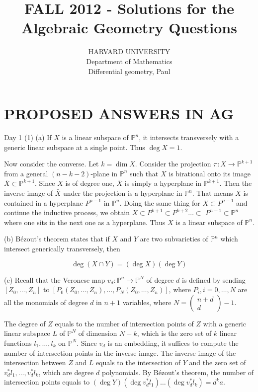 \documentclass[10pt]{article}
\title{FALL 2012 - Solutions for the Algebraic Geometry Questions }
\author{HARVARD UNIVERSITY\\
Department of Mathematics\\
Differential geometry, Paul}
\date{}
\begin{document}
\maketitle
\section{PROPOSED ANSWERS IN AG}
Day 1 (1) (a) If $X$ is a linear subspace of $\mathbb{P}^{n}$, it intersects transversely with a generic linear subspace at a single point. Thus $\operatorname{deg} X=1$.

Now consider the converse. Let $k=\operatorname{dim} X$. Consider the projection $\pi: X \rightarrow \mathbb{P}^{k+1}$ from a general $(n-k-2)$-plane in $\mathbb{P}^{n}$ such that $X$ is birational onto its image $\bar{X} \subset \mathbb{P}^{k+1}$. Since $X$ is of degree one, $\bar{X}$ is simply a hyperplane in $\mathbb{P}^{k+1}$. Then the inverse image of $\bar{X}$ under the projection is a hyperplane in $\mathbb{P}^{n}$. That means $X$ is contained in a hyperplane $P^{n-1}$ in $\mathbb{P}^{n}$. Doing the same thing for $X \subset P^{n-1}$ and continue the inductive process, we obtain $X \subset P^{k+1} \subset P^{k+2} \ldots \subset$ $P^{n-1} \subset \mathbb{P}^{n}$ where one sits in the next one as a hyperplane. Thus $X$ is a linear subspace of $\mathbb{P}^{n}$.

(b) Bézout's theorem states that if $X$ and $Y$ are two subvarieties of $\mathbb{P}^{n}$ which intersect generically transversely, then

$$
\operatorname{deg}(X \cap Y)=(\operatorname{deg} X)(\operatorname{deg} Y)
$$

(c) Recall that the Veronese map $v_{d}: \mathbb{P}^{n} \rightarrow \mathbb{P}^{N}$ of degree $d$ is defined by sending $\left[Z_{0}, \ldots, Z_{n}\right]$ to $\left[P_{0}\left(Z_{0}, \ldots, Z_{n}\right), \ldots, P_{N}\left(Z_{0}, \ldots, Z_{n}\right)\right]$, where $P_{i}, i=0, \ldots, N$ are all the monomials of degree $d$ in $n+1$ variables, where $N=\left(\begin{array}{c}n+d \\ d\end{array}\right)-1$.

The degree of $Z$ equals to the number of intersection points of $Z$ with a generic linear subspace $L$ of $\mathbb{P}^{N}$ of dimension $N-k$, which is the zero set of $k$ linear functions $l_{1}, \ldots, l_{k}$ on $\mathbb{P}^{N}$. Since $v_{d}$ is an embedding, it suffices to compute the number of intersection points in the inverse image. The inverse image of the intersection between $Z$ and $L$ equals to the intersection of $Y$ and the zero set of $v_{d}^{*} l_{1}, \ldots, v_{d}^{*} l_{k}$, which are degree $d$ polynomials. By Bézout's theorem, the number of intersection points equals to $(\operatorname{deg} Y)\left(\operatorname{deg} v_{d}^{*} l_{1}\right) \ldots\left(\operatorname{deg} v_{d}^{*} l_{k}\right)=d^{k} a$.
\end{document}
